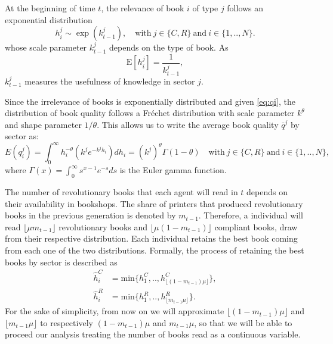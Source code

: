 \documentclass[12pt]{article}
\begin{document}
At the beginning of time $t$, the relevance of book $i$ of type $j$ follows an exponential distribution
\begin{equation}
h^j_i \sim \exp(k_{t-1}^j), \quad \text{with} \ j\in \{C,R\} \ \text{and} \ i\in \{1,..,N\}.
\end{equation}
whose scale parameter $k_{t-1}^j$ depends on the type of book. As
$$
\mbox{E}[h^j_i]=\frac{1}{k^j_{t-1}},
$$
$k^j_{t-1}$ measures the usefulness of knowledge in sector $j$.

Since the irrelevance of books is exponentially distributed and given \ref{eq:qi}, the distribution of book quality follows a Fréchet distribution with scale parameter $k^\theta$ and shape parameter $1/\theta$. This allows us to write the average book quality $\bar{q}^j$ by sector as:
\begin{equation}
E(q^j_i)=\int_0^\infty h^{-\theta}_i (k^j e^{-k^j h_i})dh_i=(k^j)^{\theta}\Gamma(1-\theta)\quad \text{with} \ j\in \{C,R\} \ \text{and} \ i\in \{1,..,N\},
\end{equation}
where $\Gamma(x)=\int_0^\infty s^{x-1} e^{-s}ds$ is the Euler gamma function.

The number of revolutionary books that each agent will read in $t$ depends on their availability in bookshops. The share of printers that produced revolutionary books in the previous generation is denoted by  $m_{t-1}$. Therefore, a individual will read $\lfloor \mu m_{t-1} \rfloor$ revolutionary books  and $\lfloor \mu (1-m_{t-1}) \rfloor$ compliant books, draw from their respective distribution. Each individual retains the best book coming from each one of the two distributions.
  Formally, the process of retaining the best books by sector is described as
\begin{align*}	
   \hat{h}^C_i&=\text{min}\{h^C_1,..,h^C_{\lfloor(1-m_{t-1}) \mu\rfloor}\},
 \\ \hat{h}^R_i&=\text{min}\{h^R_1,..,h^R_{\lfloor m_{t-1} \mu \rfloor}\}.
 \end{align*}
 For the sake of simplicity, from now on we will approximate $\lfloor(1-m_{t-1}) \mu\rfloor$ and $\lfloor m_{t-1} \mu \rfloor$ to respectively  $(1-m_{t-1}) \mu$ and $m_{t-1} \mu $, so that we will be able to proceed our analysis treating the number of books read as a continuous variable.
\end{document}
